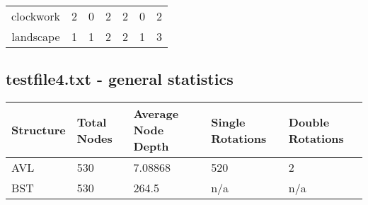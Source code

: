 \documentclass{article} %
\begin{document}
\begin{tabular}{c|c|c|c|c|c|c|}
\multicolumn{1}{|c|}{clockwork} & 2                                                             & 0                                                              & 2                                                              & 2                                                             & 0                                                              & 2                                                              \\
\multicolumn{1}{|c|}{landscape} & 1                                                             & 1                                                              & 2                                                              & 2                                                             & 1                                                              & 3                                                              \\ \hline
\end{tabular}
\subsection*{testfile4.txt - general statistics}
\begin{tabular}{|l|l|l|l|l|}
\hline
Structure & Total Nodes & Average Node Depth & Single Rotations & Double Rotations \\ \hline
AVL       & 530         & 7.08868            & 520              & 2                \\ \hline
BST       & 530         & 264.5              & n/a              & n/a              \\ \hline
\end{tabular}
\end{document}

